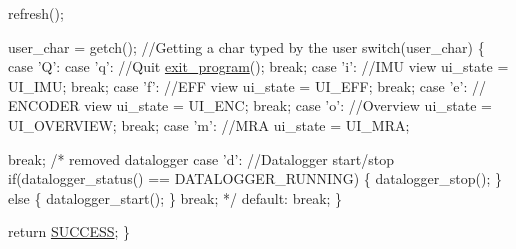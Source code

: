 \begin{DoxyCode}
        refresh();

        user\_char = getch(); \textcolor{comment}{//Getting a char typed by the user}
        \textcolor{keywordflow}{switch}(user\_char)
        \{
                \textcolor{keywordflow}{case} \textcolor{charliteral}{'Q'}:
                \textcolor{keywordflow}{case} \textcolor{charliteral}{'q'}: \textcolor{comment}{//Quit}
                        \hyperlink{main_8c_a5f05ce725141ddfab683e059b1cd95ea}{exit\_program}();
                        \textcolor{keywordflow}{break};
                \textcolor{keywordflow}{case} \textcolor{charliteral}{'i'}: \textcolor{comment}{//IMU view}
                        ui\_state = UI\_IMU;
                        \textcolor{keywordflow}{break};
                \textcolor{keywordflow}{case} \textcolor{charliteral}{'f'}: \textcolor{comment}{//EFF view}
                        ui\_state = UI\_EFF;
                        \textcolor{keywordflow}{break};
            \textcolor{keywordflow}{case} \textcolor{charliteral}{'e'}: \textcolor{comment}{// ENCODER view}
                    ui\_state = UI\_ENC;
                    \textcolor{keywordflow}{break};
                \textcolor{keywordflow}{case} \textcolor{charliteral}{'o'}: \textcolor{comment}{//Overview}
                        ui\_state = UI\_OVERVIEW;
                        \textcolor{keywordflow}{break};
                \textcolor{keywordflow}{case} \textcolor{charliteral}{'m'}: \textcolor{comment}{//MRA}
                        ui\_state = UI\_MRA;
                
                        \textcolor{keywordflow}{break};
                \textcolor{comment}{/* removed datalogger}
\textcolor{comment}{                case 'd': //Datalogger start/stop}
\textcolor{comment}{                  if(datalogger\_status() == DATALOGGER\_RUNNING)}
\textcolor{comment}{                  \{}
\textcolor{comment}{                    datalogger\_stop();}
\textcolor{comment}{                  \}}
\textcolor{comment}{                  else}
\textcolor{comment}{                  \{}
\textcolor{comment}{                    datalogger\_start();}
\textcolor{comment}{                  \}}
\textcolor{comment}{                  break;}
\textcolor{comment}{                */}
               \textcolor{keywordflow}{default}:
                 \textcolor{keywordflow}{break};
        \}

        \textcolor{keywordflow}{return} \hyperlink{calibration_2calibration_8h_aa90cac659d18e8ef6294c7ae337f6b58}{SUCCESS};
\}
\end{DoxyCode}


